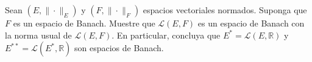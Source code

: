 Sean $(E, \| \cdot \|_E)$ y $(F, \| \cdot \|_F)$ espacios vectoriales normados. Suponga que $F$ es un espacio de Banach. Muestre que $\mathcal{L}(E, F)$ es un espacio de Banach con la norma usual de $\mathcal{L}(E, F)$. En particular, concluya que $E^* = \mathcal{L}(E, \mathbb{R})$ y $E^{**} = \mathcal{L}(E^*, \mathbb{R})$ son espacios de Banach.

